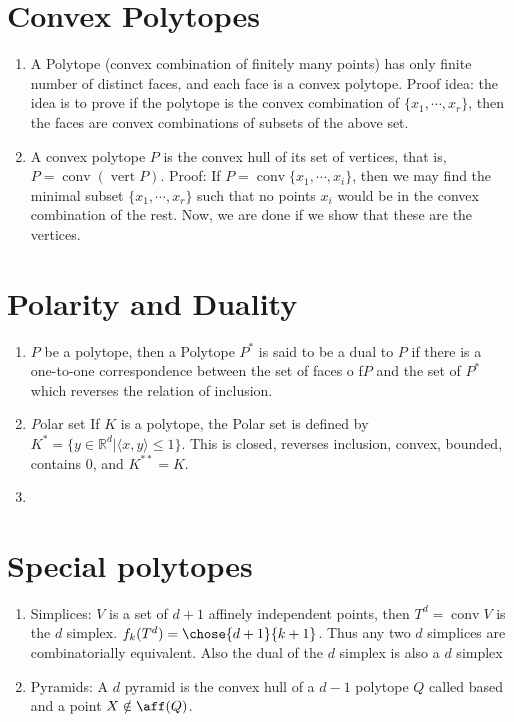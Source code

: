 \documentclass[a4paper,10pt,landscape]{article}
\def\R{\mathbb{R}}
\def\conv{\operatorname{conv}}
\def\verti{\operatorname{vert}}
\begin{document}
\begin{multicols}{3}
  \section{Convex Polytopes}
  \begin{enumerate}
  \item A Polytope (convex combination of finitely many points) has only finite
    number of distinct faces, and each face is a convex polytope. Proof idea:
    the idea is to prove if the polytope is the convex combination of $\{x_1,
    \cdots, x_r\}$, then the faces are convex combinations of subsets of the
    above set.
  \item A convex polytope $P$ is the convex hull of its set of vertices, that
    is, $P = \conv(\verti P)$. Proof: If $P = \conv \{x_1, \cdots, x_i\}$, then
    we may find the minimal subset $\{x_1, \cdots, x_r\}$ such that no points
    $x_i$ would be in the convex combination of the rest. Now, we are done if we
    show that these are the vertices.
  \end{enumerate}

  \section{Polarity and Duality}
  \begin{enumerate}
  \item $P$ be a polytope, then a Polytope $P^{*}$ is said to be a dual to $P$
    if there is a one-to-one correspondence between the set of faces o f$P$ and
    the set of $P^{*}$ which reverses the relation of inclusion.
  \item {\emph Polar set} If $K$ is a polytope, the Polar set is defined by
    $K^{*} = \{y \in \R^d \vert \langle x, y \rangle \le 1\}$. This is closed,
    reverses inclusion, convex, bounded, contains 0, and $K^{**} = K$.
  \item 
  \end{enumerate}

  \section{Special polytopes}
  \begin{enumerate}
    \item Simplices: $V$ is a set of $d+1$ affinely independent points, then
      $T^d = \conv V$ is the $d$ simplex. $f_k(T^d) = \chose{d+1}{k+1}$. Thus
      any two $d$ simplices are combinatorially equivalent. Also the dual of the
      $d$ simplex is also a $d$ simplex
    \item Pyramids: A $d$ pyramid is the convex hull of a $d-1$ polytope $Q$ called
      based and a point $X \notin \aff(Q)$.
    \end{enumerate}


\end{multicols}
\end{document}
